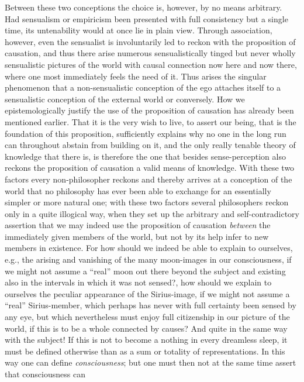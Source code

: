 \documentclass[12pt,a4paper,openany]{book}
\newcommand{\opage}[1]{\marginnote{\footnotesize\textit{[#1]}}}
\begin{document}
Between these two conceptions the choice is, however, by no means arbitrary. Had
sensualism or empiricism been presented with full consistency but a single time, its
untenability would at once lie in plain view. Through association, however, even the
sensualist is involuntarily led to reckon with the proposition of causation, and thus
there arise numerous sensualistically tinged but never wholly sensualistic pictures of the
world with causal connection now here and now there, where one most immediately feels the
need of it. Thus arises the singular phenomenon that a non-sensualistic conception of the
ego attaches itself to a sensualistic conception of the external world or conversely. How
we epistemologically justify the use of the proposition of causation has already been
mentioned earlier. That it is the very wish to live, to assert our being, that is the
foundation of this proposition, sufficiently explains why no one in the long run can
throughout abstain from building on it, and the only really tenable theory of knowledge
that there is, is therefore the one that besides sense-perception also reckons the
proposition of causation a valid means of knowledge. With these two factors every
non-philosopher reckons and thereby arrives at a conception of the world that no
philosophy has ever been able to exchange for an essentially simpler or more natural one;
with these two factors several philosophers reckon only in a quite illogical way, when
they set up the arbitrary and self-contradictory assertion that we may indeed use the
proposition of causation \emph{between} the immediately given members of the world, but
not by its help infer to new members in existence. For how should we indeed be able to
explain to ourselves, e.g., the arising and vanishing of the many moon-images in our
consciousness, if we might not assume a ``real'' moon out there beyond the subject and
existing also in the intervals in which it was not sensed?, how should we explain to
ourselves the peculiar appearance of the Sirius-image, if we might not
\setcounter{footnote}{0}%
\opage{259}assume a ``real'' Sirius-member, which perhaps has never with full certainty been
sensed by any eye, but which nevertheless must enjoy full citizenship in our picture of
the world, if this is to be a whole connected by causes? And quite in the same way with
the subject! If this is not to become a nothing in every dreamless sleep, it must be
defined otherwise than as a sum or totality of representations. In this way one can define
\emph{consciousness}; but one must then not at the same time assert that consciousness can
\end{document}
